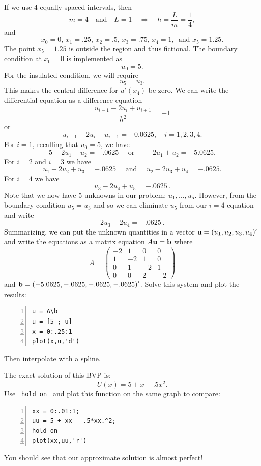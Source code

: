 If we use 4 equally spaced intervals, then
$$
    m=4\quad\text{and}\quad L=1 \quad \Rightarrow \quad h = \frac{L}{m} = \frac{1}{4},
 $$
and
$$
   x_0 = 0,\, x_1 = .25,\, x_2 = .5,\, x_3 = .75,\, x_4 = 1,\,
   \text{ and } x_5 = 1.25.
$$
The point $x_5 = 1.25$ is outside the region and thus fictional.
The boundary condition at $x_0 = 0$ is implemented as
$$
   u_0 = 5.
$$
For the insulated condition, we will require
$$
        u_5 = u_3.
$$
This makes the central difference for $u'(x_4)$ be zero.
We can write the differential equation as a difference equation
$$
     \frac{u_{i-1} -2 u_i + u_{i+1}}{h^2} = -1
$$
or
$$
     u_{i-1} -2 u_i + u_{i+1} = -0.0625,   \quad i = 1,2,3,4.
$$
For $i = 1$, recalling that $u_0 = 5$, we have
$$
5 - 2 u_1 + u_2 = -.0625   \quad \textrm{ or } \quad - 2 u_1 + u_2 = -5.0625. 
$$
For $i=2$ and $i=3$ we have
$$
u_1 - 2 u_2 + u_3 = -.0625 \quad \textrm{ and } \quad  u_2 -2 u_3 + u_4 
= -.0625. 
$$
For $i=4$ we have
$$
      u_3 - 2 u_4 + u_5 = -.0625\,.
$$
Note that we now have 5 unknowns in our problem: $u_1, \ldots, u_5$.
However, from the boundary condition $u_5 = u_3$ and so we can eliminate $u_5$ 
from our \(i=4\) equation and write
$$
   2 u_3 - 2 u_4 = -.0625\,.
$$
Summarizing, we can put the unknown quantities in a vector $\mathbf{u} =
(u_1,u_2,u_3,u_4)'$ and write the equations as a matrix equation $A
\mathbf{u} = \mathbf{b}$ where
$$
A = \left( \begin{array}{cccc}
          -2 & 1   & 0  &   0    \\
            1 & -2 & 1  &  0       \\
           0  &  1  & -2   & 1 \\
           0 &  0   & 2   & -2
            \end{array}
     \right)
$$
and $\mathbf{b} = (-5.0625, -.0625, -.0625, -.0625)'$.
Solve this system and plot the results:
\begin{lstlisting}[frame=none,numbers=left]
u = A\b
u = [5 ; u]
x = 0:.25:1
plot(x,u,'d')
\end{lstlisting}
Then interpolate with a spline.

The exact solution of this BVP is:
$$
   U(x) = 5 +  x - .5 x^2.
$$
Use \verb& hold on & and plot this function on the same graph to compare:
\begin{lstlisting}[frame=none,numbers=left]
xx = 0:.01:1;
uu = 5 + xx - .5*xx.^2;
hold on
plot(xx,uu,'r')
\end{lstlisting}
You should see that our approximate solution is almost perfect!


